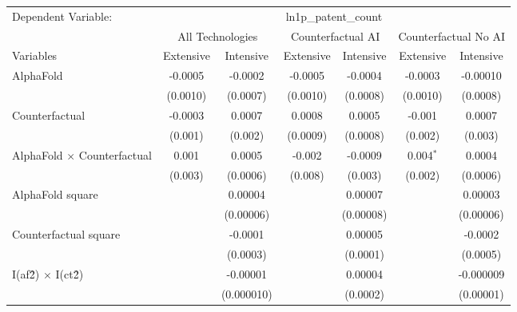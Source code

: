 \begingroup
\centering
\begin{tabular}{lcccccc}
   \tabularnewline \midrule \midrule
   Dependent Variable: & \multicolumn{6}{c}{ln1p\_patent\_count}\\
 & \multicolumn{2}{c}{All Technologies} & \multicolumn{2}{c}{Counterfactual AI} & \multicolumn{2}{c}{Counterfactual No AI} \\
\cmidrule(lr){1-1}\cmidrule(lr){2-3} \cmidrule(lr){4-5} \cmidrule(lr){6-7}
Variables & \multicolumn{1}{c}{Extensive} & \multicolumn{1}{c}{Intensive} & \multicolumn{1}{c}{Extensive} & \multicolumn{1}{c}{Intensive} & \multicolumn{1}{c}{Extensive} & \multicolumn{1}{c}{Intensive} \\
\cmidrule(lr){1-1}\cmidrule(lr){2-2} \cmidrule(lr){3-3} \cmidrule(lr){4-4} \cmidrule(lr){5-5} \cmidrule(lr){6-6} \cmidrule(lr){7-7}
   AlphaFold                          & -0.0005  & -0.0002    & -0.0005  & -0.0004   & -0.0003     & -0.00010\\   
                                      & (0.0010) & (0.0007)   & (0.0010) & (0.0008)  & (0.0010)    & (0.0008)\\   
   Counterfactual                     & -0.0003  & 0.0007     & 0.0008   & 0.0005    & -0.001      & 0.0007\\   
                                      & (0.001)  & (0.002)    & (0.0009) & (0.0008)  & (0.002)     & (0.003)\\   
   AlphaFold $\times$ Counterfactual  & 0.001    & 0.0005     & -0.002   & -0.0009   & 0.004$^{*}$ & 0.0004\\   
                                      & (0.003)  & (0.0006)   & (0.008)  & (0.003)   & (0.002)     & (0.0006)\\   
   AlphaFold square                   &          & 0.00004    &          & 0.00007   &             & 0.00003\\   
                                      &          & (0.00006)  &          & (0.00008) &             & (0.00006)\\   
   Counterfactual square              &          & -0.0001    &          & 0.00005   &             & -0.0002\\   
                                      &          & (0.0003)   &          & (0.0001)  &             & (0.0005)\\   
   I(af\^2) $\times$ I(ct\^2)         &          & -0.00001   &          & 0.00004   &             & -0.000009\\   
                                      &          & (0.000010) &          & (0.0002)  &             & (0.00001)\\   

\end{tabular}
